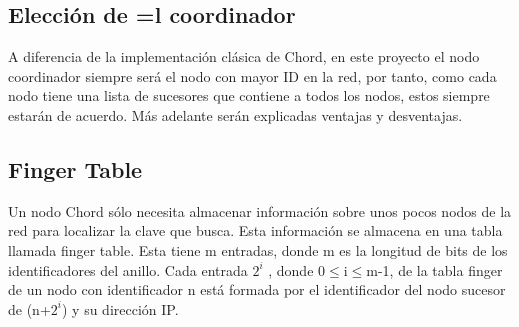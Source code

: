 \documentclass[10pt, a4paper]{article}
\begin{document}
    \subsection{Elecci\'on de =l coordinador}
    A diferencia de la implementación clásica de Chord, en este proyecto el nodo coordinador siempre será el nodo con mayor ID en la red, por tanto, como cada nodo tiene una lista de sucesores que contiene a todos los nodos, estos siempre estarán de acuerdo. Más adelante serán explicadas ventajas y desventajas.\\
    
    \subsection{Finger Table} 
    Un nodo Chord sólo necesita almacenar información sobre unos pocos nodos de la red para localizar la clave que busca. Esta información se almacena en una tabla llamada finger table. Esta tiene m entradas, donde m es la longitud de bits de los identificadores del anillo. Cada entrada $2^i$ , donde 0$\leq$i$\leq$m-1, de la tabla finger de un nodo con identificador n está formada por el identificador del nodo sucesor de (n+$2^i$) y su dirección IP.\\
    
\end{document}
